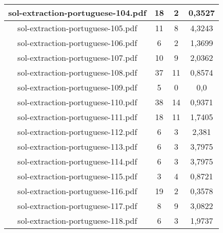 \documentclass[11pt]{article}
\newlength\mylength
\begin{document}
\begin{center}
\begin{longtable}{||C{.40\mylength}||C{.30\mylength}||C{.30\mylength}||C{.30\mylength}||}
  sol-extraction-portuguese-104.pdf & 18 & 2 & 0,3527 \\  \hline
  sol-extraction-portuguese-105.pdf & 11 & 8 & 4,3243 \\  \hline
  sol-extraction-portuguese-106.pdf & 6 & 2 & 1,3699 \\  \hline
  sol-extraction-portuguese-107.pdf & 10 & 9 & 2,0362 \\  \hline
  sol-extraction-portuguese-108.pdf & 37 & 11 & 0,8574 \\  \hline
  sol-extraction-portuguese-109.pdf & 5 & 0 & 0,0 \\  \hline
  sol-extraction-portuguese-110.pdf & 38 & 14 & 0,9371 \\  \hline
  sol-extraction-portuguese-111.pdf & 18 & 11 & 1,7405 \\  \hline
  sol-extraction-portuguese-112.pdf & 6 & 3 & 2,381 \\  \hline
  sol-extraction-portuguese-113.pdf & 6 & 3 & 3,7975 \\  \hline
  sol-extraction-portuguese-114.pdf & 6 & 3 & 3,7975 \\  \hline
  sol-extraction-portuguese-115.pdf & 3 & 4 & 0,8721 \\  \hline
  sol-extraction-portuguese-116.pdf & 19 & 2 & 0,3578 \\  \hline
  sol-extraction-portuguese-117.pdf & 8 & 9 & 3,0822 \\  \hline
  sol-extraction-portuguese-118.pdf & 6 & 3 & 1,9737 \\  \hline

\end{longtable}
\end{center}
\end{document}
